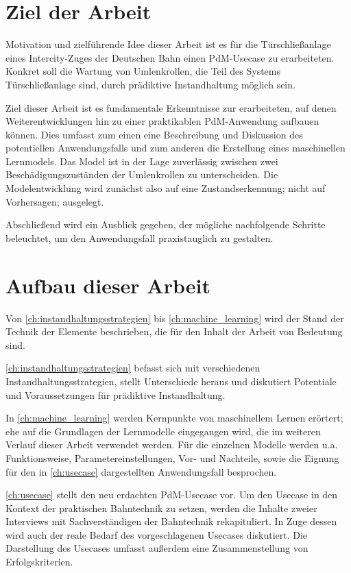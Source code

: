 \section{Ziel der Arbeit}
\label{sec:ziel}
Motivation und zielführende Idee dieser Arbeit ist es für die Türschließanlage eines Intercity-Zuges der Deutschen Bahn einen PdM-Usecase zu erarbeiteten. Konkret soll die Wartung von Umlenkrollen, die Teil des Systems Türschließanlage sind, durch prädiktive Instandhaltung möglich sein.

Ziel dieser Arbeit ist es fundamentale Erkenntnisse zur erarbeiteten, auf denen Weiterentwicklungen hin zu einer praktikablen PdM-Anwendung aufbauen können. Dies umfasst zum einen eine Beschreibung und Diskussion des potentiellen Anwendungsfalls und zum anderen die Erstellung eines maschinellen Lernmodels. Das Model ist in der Lage zuverlässig zwischen zwei Beschädigungszuständen der Umlenkrollen zu unterscheiden. Die Modelentwicklung wird zunächst also auf eine Zustandserkennung; nicht auf Vorhersagen; ausgelegt.

Abschließend wird ein Ausblick gegeben, der mögliche nachfolgende Schritte beleuchtet, um den Anwendungsfall praxistauglich zu gestalten.
\section{Aufbau dieser Arbeit}
\label{sec:aufbau_dieser_arbeit}
Von \cref{ch:instandhaltungsstrategien} bis \cref{ch:machine_learning} wird der Stand der Technik der Elemente beschrieben, die für den Inhalt der Arbeit von Bedeutung sind.

\cref{ch:instandhaltungsstrategien} befasst sich mit verschiedenen Instandhaltungsstrategien, stellt Unterschiede heraus und diskutiert Potentiale und Voraussetzungen für prädiktive Instandhaltung.

In \cref{ch:machine_learning} werden Kernpunkte von maschinellem Lernen erörtert; ehe auf die Grundlagen der Lernmodelle eingegangen wird, die im weiteren Verlauf dieser Arbeit verwendet werden. Für die einzelnen Modelle werden u.a. Funktionsweise, Parametereinstellungen, Vor- und Nachteile, sowie die Eignung für den in \cref{ch:usecase} dargestellten Anwendungsfall besprochen. 

\cref{ch:usecase} stellt den neu erdachten PdM-Usecase vor. Um den Usecase in den Kontext der praktischen Bahntechnik zu setzen, werden die Inhalte zweier Interviews mit Sachverständigen der Bahntechnik rekapituliert. In Zuge dessen wird auch der reale Bedarf des vorgeschlagenen Usecases diskutiert. Die Darstellung des Usecases umfasst außerdem eine Zusammenstellung von Erfolgskriterien.

